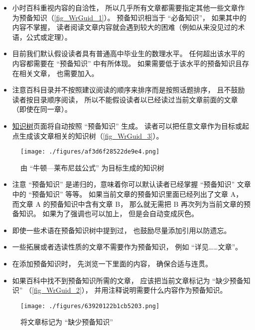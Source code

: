 \begin{itemize}
\item 小时百科重视内容的自洽性， 所以几乎所有文章都需要指定其他一些文章作为预备知识（\autoref{fig_WrGuid_1}）。 预备知识相当于 “必备知识”， 如果其中的内容不掌握， 读者阅读文章内容就会遇到较大的困难（例如从来没见过的术语，公式或定理）。
\item 目前我们默认假设读者具有普通高中毕业生的数理水平。 任何超出该水平的内容都需要在 “预备知识” 中有所体现。 如果需要低于该水平的预备知识且存在相关文章， 也需要加入。
\item 注意百科目录并不按照建议阅读的顺序来排序而是按照话题排序， 且不鼓励读者按目录顺序阅读， 所以不能假设读者以已经读过当前文章前面的文章（即使在同一章）。
\item \href{https://wuli.wiki/tree/}{知识树}页面将自动按照 “预备知识” 生成。 读者可以把任意文章作为目标或起点生成该文章相关的知识树（\autoref{fig_WrGuid_3}）。
\end{itemize}

\begin{figure}[ht]
\centering
\texttt{[image: ./figures/af3d6f28522de9e4.png]}
\caption{由 “牛顿—莱布尼兹公式” 为目标生成的知识树} \label{fig_WrGuid_3}
\end{figure}

\begin{itemize}
\item 注意 “预备知识” 是递归的，意味着你可以默认读者已经掌握 “预备知识” 文章中的 “预备知识” 等等。 如果当前文章的预备知识里面已经列出了文章 A， 而文章 A 的预备知识中含有文章 B， 那么就无需把 B 再次列为当前文章的预备知识。 如果为了强调也可以加上， 但是会自动变成灰色。
\item 即使一些术语在预备知识树中提到过， 也鼓励尽量添加引用以防遗忘。
\item 一些拓展或者选读性质的文章不需要作为预备知识， 例如 “详见……文章”。
\item 在添加预备知识时， 先浏览一下里面的内容， 确保合适与连贯。
\item 如果百科中找不到预备知识所需的文章， 应该把当前文章标记为 “缺少预备知识” （\autoref{fig_WrGuid_2}）， 并用注释说明需要什么内容作为预备知识。
\end{itemize}

\begin{figure}[ht]
\centering
\texttt{[image: ./figures/63920122b1cb5203.png]}
\caption{将文章标记为 “缺少预备知识”} \label{fig_WrGuid_2}
\end{figure}


